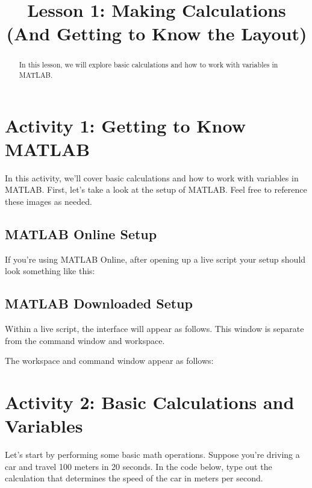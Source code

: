 \documentclass{ximera}
\title{Lesson 1: Making Calculations (And Getting to Know the Layout)}
\begin{document}
\begin{abstract}
In this lesson, we will explore basic calculations and how to work with variables in MATLAB.
\end{abstract}

\section*{Activity 1: Getting to Know MATLAB}

In this activity, we'll cover basic calculations and how to work with variables in MATLAB. 
First, let's take a look at the setup of MATLAB. Feel free to reference these images as needed.

\subsection*{MATLAB Online Setup}

If you're using MATLAB Online, after opening up a live script your setup should look something like this:


\subsection*{MATLAB Downloaded Setup}

Within a live script, the interface will appear as follows. This window is separate from the command window and workspace.


The workspace and command window appear as follows:


\section*{Activity 2: Basic Calculations and Variables}

Let's start by performing some basic math operations. Suppose you're driving a car and travel 100 meters in 20 seconds.
In the code below, type out the calculation that determines the speed of the car in meters per second.
\end{document}
